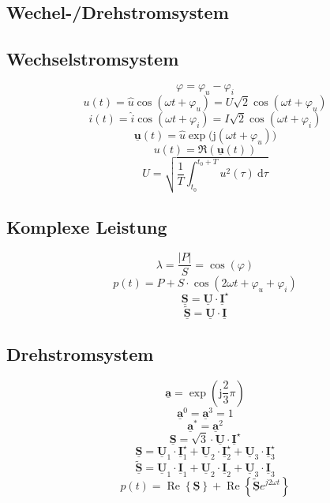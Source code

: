\documentclass[9pt,a4paper]{scrartcl}
\renewcommand{\vec}[1]{\ensuremath{\underline{\boldsymbol {#1}}}}
\renewcommand{\i}{\ensuremath{\mathrm{j}}}										%
\newcommand{\diff}{\ensuremath{\ \mathrm d}}									%
\begin{document}
\begin{multicols}{3}
	\section{Wechel-/Drehstromsystem}
		\subsection{Wechselstromsystem}
		\[\varphi = \varphi_u - \varphi_i\]		
		\[u(t) = \hat u \cos(\omega t + \varphi_u) = U \sqrt{2} \cos(\omega t + \varphi_u)\]
		\[i(t) = \hat i \cos(\omega t + \varphi_i) = I \sqrt{2} \cos(\omega t + \varphi_i)\]
		\[\vec u(t) = \hat u \exp\big(\i (\omega t + \varphi_u)\big)\] 
		\[u(t) = \Re(\vec u(t))\]
		\[U = \sqrt{\frac{1}{T} \int_{t_0}^{t_0 + T} u^2(\tau) \diff \tau}\]
	
		\subsection{Komplexe Leistung}
		\[\lambda = \frac{|P|}{S} = \cos(\varphi)\]
		\[p(t) = P + S \cdot \cos(2\omega t + \varphi_u + \varphi_i)\]
		\[\vec S = \vec U \cdot \vec I^\star\]
		\[\tilde {\vec S} = \vec U \cdot \vec I\]

		\subsection{Drehstromsystem}
		\[\vec a = \exp \left(\i \frac{2}{3} \pi \right)\] 
		\[\vec a^0 = \vec a^3 = 1\] 
		\[\vec a^* = \vec a^2\]		
		\[\vec S = \sqrt{3} \cdot \vec U \cdot \vec I^\star\]
		\[\vec S = \vec U_1 \cdot \vec I_1^\star + \vec U_2 \cdot \vec I_2^\star + \vec U_3 \cdot \vec I_3^\star\]
		\[\tilde{\vec S} = \vec U_1 \cdot \vec I_1 + \vec U_2 \cdot \vec I_2 + \vec U_3 \cdot \vec I_3\]
		\[p(t) = \operatorname{Re} \left\{ \vec S \right\} + \operatorname{Re} \left\{\tilde{\vec S} e^{j 2 \omega t} \right\}\]
		

\end{multicols}
\end{document}
